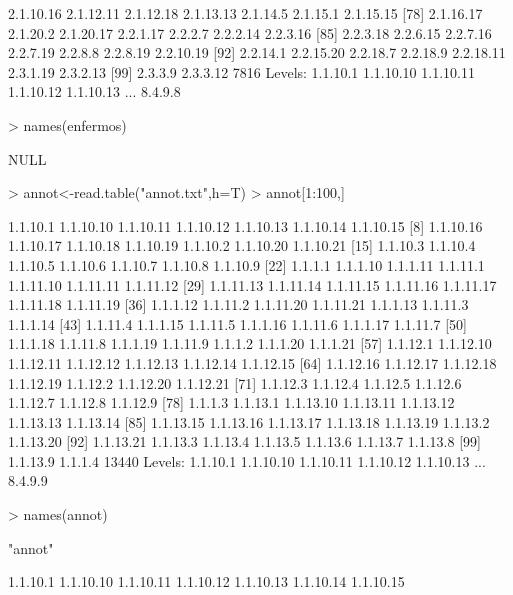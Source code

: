 \documentclass[12pt]{article}
\begin{document}
\begin{Schunk}
\begin{Soutput}
 [71] 2.1.10.16 2.1.12.11 2.1.12.18 2.1.13.13 2.1.14.5  2.1.15.1  2.1.15.15
 [78] 2.1.16.17 2.1.20.2  2.1.20.17 2.2.1.17  2.2.2.7   2.2.2.14  2.2.3.16 
 [85] 2.2.3.18  2.2.6.15  2.2.7.16  2.2.7.19  2.2.8.8   2.2.8.19  2.2.10.19
 [92] 2.2.14.1  2.2.15.20 2.2.18.7  2.2.18.9  2.2.18.11 2.3.1.19  2.3.2.13 
 [99] 2.3.3.9   2.3.3.12 
7816 Levels: 1.1.10.1 1.1.10.10 1.1.10.11 1.1.10.12 1.1.10.13 ... 8.4.9.8
\end{Soutput}
\begin{Sinput}
> names(enfermos)
\end{Sinput}
\begin{Soutput}
NULL
\end{Soutput}
\begin{Sinput}
> annot<-read.table("annot.txt",h=T)
> annot[1:100,]
\end{Sinput}
\begin{Soutput}
  [1] 1.1.10.1  1.1.10.10 1.1.10.11 1.1.10.12 1.1.10.13 1.1.10.14 1.1.10.15
  [8] 1.1.10.16 1.1.10.17 1.1.10.18 1.1.10.19 1.1.10.2  1.1.10.20 1.1.10.21
 [15] 1.1.10.3  1.1.10.4  1.1.10.5  1.1.10.6  1.1.10.7  1.1.10.8  1.1.10.9 
 [22] 1.1.1.1   1.1.1.10  1.1.1.11  1.1.11.1  1.1.11.10 1.1.11.11 1.1.11.12
 [29] 1.1.11.13 1.1.11.14 1.1.11.15 1.1.11.16 1.1.11.17 1.1.11.18 1.1.11.19
 [36] 1.1.1.12  1.1.11.2  1.1.11.20 1.1.11.21 1.1.1.13  1.1.11.3  1.1.1.14 
 [43] 1.1.11.4  1.1.1.15  1.1.11.5  1.1.1.16  1.1.11.6  1.1.1.17  1.1.11.7 
 [50] 1.1.1.18  1.1.11.8  1.1.1.19  1.1.11.9  1.1.1.2   1.1.1.20  1.1.1.21 
 [57] 1.1.12.1  1.1.12.10 1.1.12.11 1.1.12.12 1.1.12.13 1.1.12.14 1.1.12.15
 [64] 1.1.12.16 1.1.12.17 1.1.12.18 1.1.12.19 1.1.12.2  1.1.12.20 1.1.12.21
 [71] 1.1.12.3  1.1.12.4  1.1.12.5  1.1.12.6  1.1.12.7  1.1.12.8  1.1.12.9 
 [78] 1.1.1.3   1.1.13.1  1.1.13.10 1.1.13.11 1.1.13.12 1.1.13.13 1.1.13.14
 [85] 1.1.13.15 1.1.13.16 1.1.13.17 1.1.13.18 1.1.13.19 1.1.13.2  1.1.13.20
 [92] 1.1.13.21 1.1.13.3  1.1.13.4  1.1.13.5  1.1.13.6  1.1.13.7  1.1.13.8 
 [99] 1.1.13.9  1.1.1.4  
13440 Levels: 1.1.10.1 1.1.10.10 1.1.10.11 1.1.10.12 1.1.10.13 ... 8.4.9.9
\end{Soutput}
\begin{Sinput}
> names(annot)
\end{Sinput}
\begin{Soutput}
[1] "annot"
\end{Soutput}
\begin{Soutput}
  [1] 1.1.10.1  1.1.10.10 1.1.10.11 1.1.10.12 1.1.10.13 1.1.10.14 1.1.10.15

\end{Soutput}
\end{Schunk}
\end{document}
